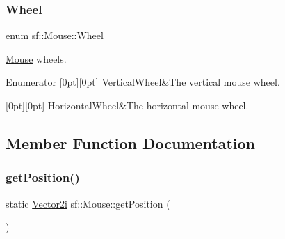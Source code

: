 \subsubsection{\texorpdfstring{Wheel}{Wheel}}
{\footnotesize\ttfamily enum \mbox{\hyperlink{classsf_1_1_mouse_a60dd479a43f26f200e7957aa11803ff4}{sf\+::\+Mouse\+::\+Wheel}}}



\mbox{\hyperlink{classsf_1_1_mouse}{Mouse}} wheels. 

\begin{DoxyVerb}\end{DoxyVerb}
 \begin{DoxyEnumFields}{Enumerator}
[0pt][0pt]{}\mbox{\label{classsf_1_1_mouse_a60dd479a43f26f200e7957aa11803ff4abd571de908d2b2c4b9f165f29c678496}} 
Vertical\+Wheel&The vertical mouse wheel. \\
\hline

[0pt][0pt]{}\mbox{\label{classsf_1_1_mouse_a60dd479a43f26f200e7957aa11803ff4a785768d5e33c77de9fdcfdd02219f4e2}} 
Horizontal\+Wheel&The horizontal mouse wheel. \\
\hline

\end{DoxyEnumFields}


\subsection{Member Function Documentation}
\mbox{\label{classsf_1_1_mouse_ac368680f797b7f6e4f50b5b7928c1387}} 
\subsubsection{\texorpdfstring{getPosition()}{getPosition()}\hspace{0.1cm}{\footnotesize\ttfamily [1/2]}}
{\footnotesize\ttfamily static \mbox{\hyperlink{classsf_1_1_vector2}{Vector2i}} sf\+::\+Mouse\+::get\+Position (\begin{DoxyParamCaption}{ }\end{DoxyParamCaption})\hspace{0.3cm}{\ttfamily [static]}}



